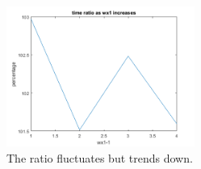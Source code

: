 \documentclass[12pt]{article}
\begin{document}
\begin{problem}[1]
\begin{enumerate}[label=(\alph*)]
~\begin{figure}[H]
	\centering
	\includegraphics[width=0.55\textwidth]{./figures/6.15.png}
	\caption{The ratio fluctuates but trends down.}
\end{figure}

\end{enumerate}
\end{problem}
\begin{problem}[2]

\end{problem}
\end{document}
